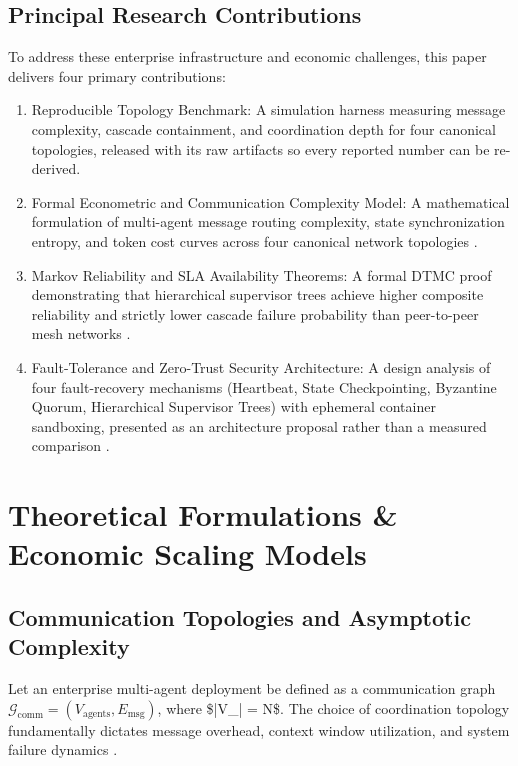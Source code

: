 \documentclass[10pt,journal,compsoc,twocolumn]{IEEEtran}
\begin{document}
\subsection{Principal Research Contributions}


To address these enterprise infrastructure and economic challenges, this paper delivers four primary contributions:
\begin{enumerate}
  \item Reproducible Topology Benchmark: A simulation harness measuring message complexity, cascade containment, and coordination depth for four canonical topologies, released with its raw artifacts so every reported number can be re-derived.
  \item Formal Econometric and Communication Complexity Model: A mathematical formulation of multi-agent message routing complexity, state synchronization entropy, and token cost curves across four canonical network topologies \cite{arxiv_2404_01131,arxiv_2203_08975}.
  \item Markov Reliability and SLA Availability Theorems: A formal DTMC proof demonstrating that hierarchical supervisor trees achieve higher composite reliability and strictly lower cascade failure probability than peer-to-peer mesh networks \cite{arxiv_2010_11146,arxiv_2412_06333}.
  \item Fault-Tolerance and Zero-Trust Security Architecture: A design analysis of four fault-recovery mechanisms (Heartbeat, State Checkpointing, Byzantine Quorum, Hierarchical Supervisor Trees) with ephemeral container sandboxing, presented as an architecture proposal rather than a measured comparison \cite{arxiv_2404_04289,openalex_w4400578758}.
\end{enumerate}




\section{Theoretical Formulations \& Economic Scaling Models}



\subsection{Communication Topologies and Asymptotic Complexity}


Let an enterprise multi-agent deployment be defined as a communication graph $\mathcal{G}_{\text{comm}} = (V_{\text{agents}}, E_{\text{msg}})$, where \$|V\_{}| = N\$. The choice of coordination topology fundamentally dictates message overhead, context window utilization, and system failure dynamics \cite{arxiv_2203_08975}.
\end{document}
